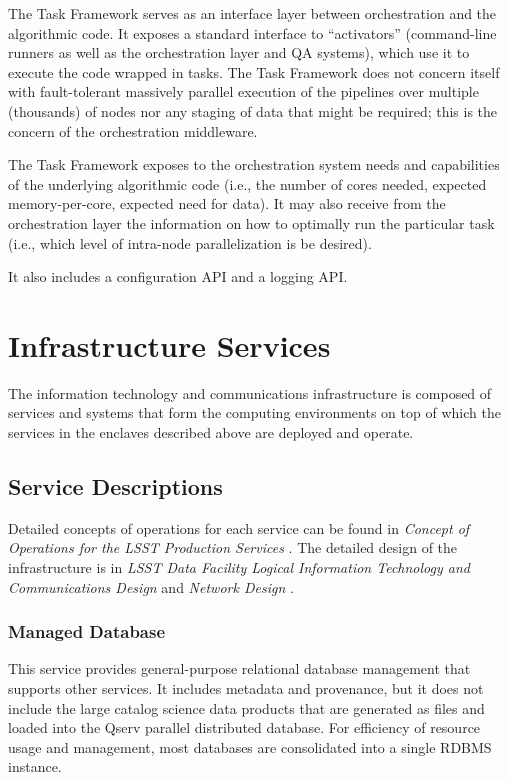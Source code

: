 \documentclass[DM,toc,lsstdraft]{lsstdoc}
\begin{document}
The Task Framework serves as an interface layer between orchestration
and the algorithmic code. It exposes a standard interface to
``activators'' (command-line runners as well as the orchestration layer
and QA systems), which use it to execute the code wrapped in tasks. The
Task Framework does not concern itself with fault-tolerant massively
parallel execution of the pipelines over multiple (thousands) of nodes
nor any staging of data that might be required; this is the concern of
the orchestration middleware.

The Task Framework exposes to the orchestration system needs and
capabilities of the underlying algorithmic code (i.e., the number of
cores needed, expected memory-per-core, expected need for data). It may
also receive from the orchestration layer the information on how to
optimally run the particular task (i.e., which level of intra-node
parallelization is be desired).

It also includes a configuration API and a logging API.


\section{Infrastructure Services}\label{infrastructure-services}

The information technology and communications infrastructure is composed of services and systems that form the computing environments on top of which the services in the enclaves described above are deployed and operate.

\subsection{Service Descriptions}\label{infrastructure-service-descriptions}

Detailed concepts of operations for each service can be found in \textit{Concept of Operations for the LSST Production Services} .
The detailed design of the infrastructure is in \textit{LSST Data Facility Logical Information Technology and Communications Design}  and \textit{Network Design} .

\subsubsection{Managed Database}\label{managed-database}

This service provides general-purpose relational database management that supports other services.
It includes metadata and provenance, but it does not include the large catalog science data products that are generated as files and loaded into the Qserv parallel distributed database.
For efficiency of resource usage and management, most databases are consolidated into a single RDBMS instance.
\end{document}
